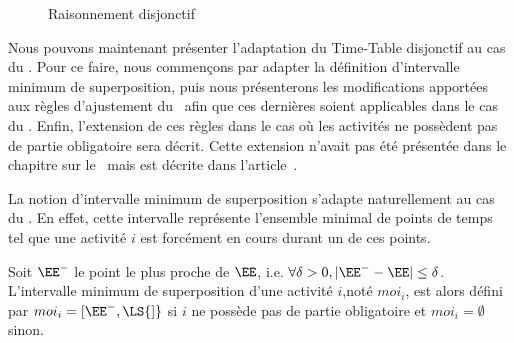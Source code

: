 \begin{ex}
\begin{figure}[htb!]
{
}
  \caption{Raisonnement disjonctif}
  \label{fig:disj_CECSP}
\end{figure}
\end{ex}

Nous pouvons maintenant présenter l'adaptation du Time-Table
disjonctif au cas du \CECSP. Pour ce faire, nous commençons par
adapter la définition d'intervalle minimum de superposition, puis nous
présenterons les modifications apportées aux règles d'ajustement du
\CUSP~afin que ces dernières soient applicables dans le cas du
\CECSP. Enfin, l'extension de ces règles dans le cas où les activités
ne possèdent pas de partie obligatoire sera décrit. Cette extension
n'avait pas été présentée dans le chapitre sur le \CUSP~mais est
décrite dans l'article~\cite{Gay2015}. 

La notion d'intervalle minimum de superposition s'adapte naturellement
au cas du \CECSP. En effet, cette intervalle représente l'ensemble
minimal de points de temps tel que une activité $i$ est forcément en
cours durant un de ces points. 

\begin{defi}
\label{des:moi_CUSP} 
Soit $\EE^{-}$ le point le plus proche de $\EE$, i.e. $\forall \delta
>0 , |\EE^{-} -\EE| \le \delta$. L'intervalle minimum de
superposition d'une activité $i$,noté $moi_i$, est alors défini par
$moi_i=[\EE^{-},\LS{]}$ si $i$ ne possède pas de partie obligatoire et
$moi_i=\emptyset$ sinon.   
\end{defi}


